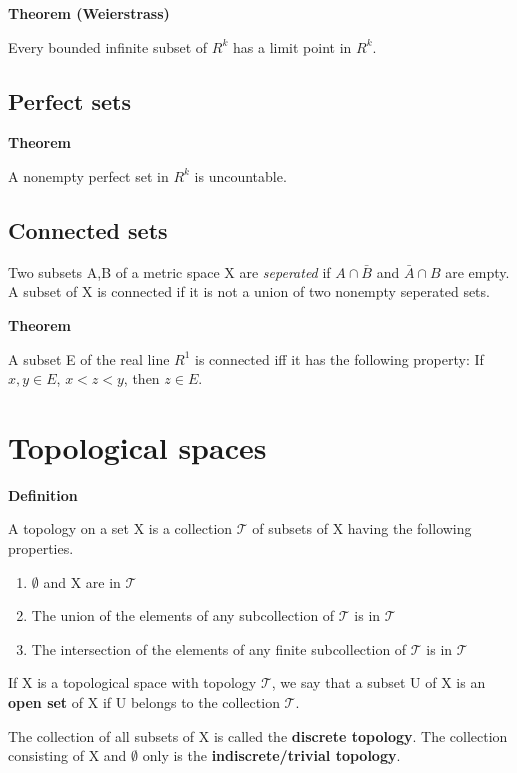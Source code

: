 \documentclass[11pt]{article}
\begin{document}
\textbf{Theorem (Weierstrass)}

Every bounded infinite subset of \(R^k\) has a limit point in \(R^k\).

\subsection{Perfect sets}
\label{sec:org1ecfacd}

\textbf{Theorem}

A nonempty perfect set in \(R^k\) is uncountable.

\subsection{Connected sets}
\label{sec:orgc813c8b}

Two subsets A,B of a metric space X are \emph{seperated} if \(A \cap \bar{B}\) and \(\bar{A}\cap B\) are empty. A subset of X is connected if it is not a union of two nonempty seperated sets.

\textbf{Theorem}

A subset E of the real line \(R^1\) is connected iff it has the following property: If \(x,y \in E\), \(x < z < y\), then \(z \in E\).

\section{Topological spaces}
\label{sec:org0b443d1}

\textbf{Definition}

A topology on a set X is a collection \(\mathcal{T}\) of subsets of X having the following properties.


\begin{enumerate}
\item \(\emptyset\) and X are in \(\mathcal{T}\)
\item The union of the elements of any subcollection of \(\mathcal{T}\) is in \(\mathcal{T}\)
\item The intersection of the elements of any finite subcollection of \(\mathcal{T}\) is in \(\mathcal{T}\)
\end{enumerate}

If X is a topological space with topology \(\mathcal{T}\), we say that a subset U of X is an \textbf{open set} of X if U belongs to the collection \(\mathcal{T}\).


The collection of all subsets of X is called the \textbf{discrete topology}. The collection consisting of X and \(\emptyset\) only is the \textbf{indiscrete/trivial topology}.
\end{document}
